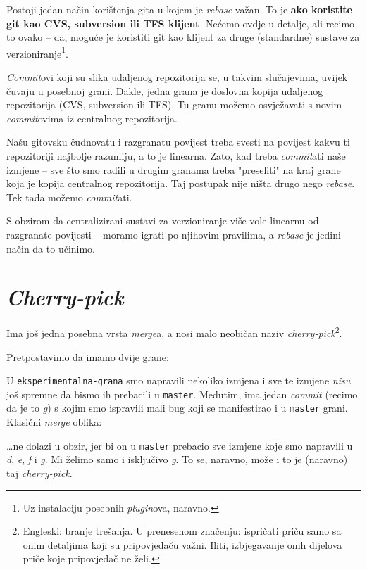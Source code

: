 Postoji jedan način korištenja gita u kojem je \emph{rebase} važan.
To je \textbf{ako koristite git kao CVS, subversion ili TFS klijent}.
Nećemo ovdje u detalje, ali recimo to ovako -- da, moguće je koristiti git kao klijent za druge (standardne) sustave za verzioniranje\footnote{Uz instalaciju posebnih \emph{plugin}ova, naravno.}.

\emph{Commit}ovi koji su slika udaljenog repozitorija se, u takvim slučajevima, uvijek čuvaju u posebnoj grani.
Dakle, jedna grana je doslovna kopija udaljenog repozitorija (CVS, subversion ili TFS).
Tu granu možemo osvježavati s novim \emph{commit}ovima iz centralnog repozitorija.

Našu gitovsku čudnovatu i razgranatu povijest treba svesti na povijest kakvu ti repozitoriji najbolje razumiju, a to je linearna.
Zato, kad treba \emph{commit}ati naše izmjene -- sve što smo radili u drugim granama treba "preseliti" na kraj grane koja je kopija centralnog repozitorija.
Taj postupak nije ništa drugo nego \emph{rebase}.
Tek tada možemo \emph{commit}ati.

S obzirom da centralizirani sustavi za verzioniranje više vole linearnu od razgranate povijesti -- moramo igrati po njihovim pravilima, a \emph{rebase} je jedini način da to učinimo.

\section*{\emph{Cherry-pick}}

Ima još jedna posebna vrsta \emph{merge}a, a nosi malo neobičan naziv \emph{cherry-pick}\footnote{Engleski: branje trešanja. U prenesenom značenju: ispričati priču samo sa onim detaljima koji su pripovjedaču važni. Iliti, izbjegavanje onih dijelova priče koje pripovjedač ne želi.}.

Pretpostavimo da imamo dvije grane:



U \verb+eksperimentalna-grana+ smo napravili nekoliko izmjena i sve te izmjene \emph{nisu} još spremne da bismo ih prebacili u \verb+master+.
Međutim, ima jedan \emph{commit} (recimo da je to \emph g) s kojim smo ispravili mali bug koji se manifestirao i u \verb+master+ grani.
Klasični \emph{merge} oblika:



\dots{}ne dolazi u obzir, jer bi on u \verb+master+ prebacio sve izmjene koje smo napravili u \emph d, \emph e, \emph f i \emph g.
Mi želimo samo i isključivo \emph g.
To se, naravno, može i to je (naravno) taj \emph{cherry-pick}.

